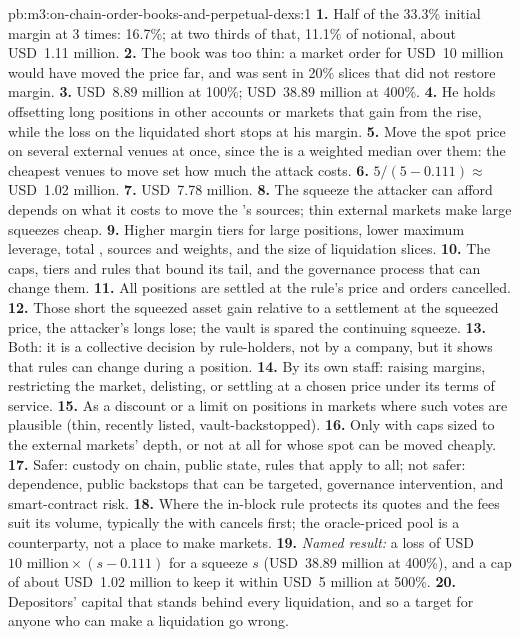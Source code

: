 \begin{solution}{pb:m3:on-chain-order-books-and-perpetual-dexs:1}
\textbf{1.} Half of the 33.3\% initial margin at 3 times: 16.7\%; at two thirds of that, 11.1\% of notional, about USD~1.11 million.
\textbf{2.} The book was too thin: a market order for USD~10 million would have moved the price far, and was sent in 20\% slices that did not
restore margin. \textbf{3.} USD~8.89 million at 100\%; USD~38.89 million at 400\%. \textbf{4.} He holds offsetting long positions in other
accounts or markets that gain from the rise, while the loss on the liquidated short stops at his margin. \textbf{5.} Move the spot price on
several external venues at once, since the  is a weighted median over them: the cheapest venues to move set how much the attack costs.
\textbf{6.} $5/(5 - 0.111) \approx$ USD~1.02 million. \textbf{7.} USD~7.78 million. \textbf{8.} The squeeze the attacker can afford depends
on what it costs to move the 's sources; thin external markets make large squeezes cheap. \textbf{9.} Higher margin tiers for large
positions, lower maximum leverage, total ,  sources and weights, and the size of liquidation slices. \textbf{10.} The
caps, tiers and  rules that bound its tail, and the governance process that can change them. \textbf{11.} All positions are settled at
the rule's price and orders cancelled. \textbf{12.} Those short the squeezed asset gain relative to a settlement at the squeezed price, the
attacker's longs lose; the vault is spared the continuing squeeze. \textbf{13.} Both: it is a collective decision by rule-holders, not by a
company, but it shows that rules can change during a position. \textbf{14.} By its own staff: raising margins, restricting the market,
delisting, or settling at a chosen price under its terms of service. \textbf{15.} As a discount or a limit on positions in markets where such
votes are plausible (thin, recently listed, vault-backstopped). \textbf{16.} Only with caps sized to the external markets' depth, or not at
all for  whose spot can be moved cheaply. \textbf{17.} Safer: custody on chain, public state, rules that apply to all; not safer:
 dependence, public backstops that can be targeted, governance intervention, and smart-contract risk. \textbf{18.} Where the in-block
rule protects its quotes and the fees suit its volume, typically the  with cancels first; the oracle-priced pool is a
counterparty, not a place to make markets. \textbf{19.} \emph{Named result:} a loss of USD~$10\text{ million} \times (s - 0.111)$ for a
squeeze $s$ (USD~38.89 million at 400\%), and a cap of about USD~1.02 million to keep it within USD~5 million at 500\%. \textbf{20.} Depositors'
capital that stands behind every liquidation, and so a target for anyone who can make a liquidation go wrong.
\end{solution}

